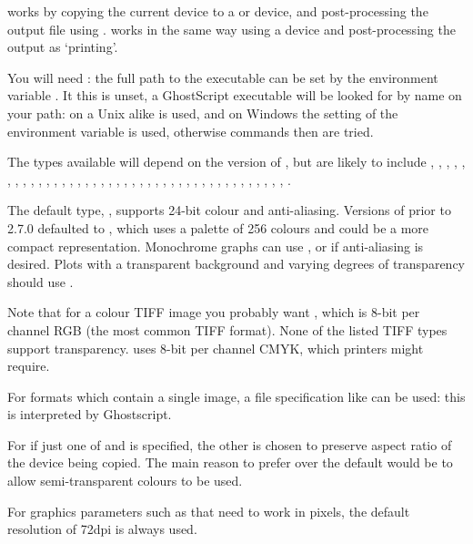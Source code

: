\begin{Details}\relax
{} works by copying the current device to a
 or  device, and
post-processing the output file using .
 works in the same way using a  device
and post-processing the output as `printing'.

You will need : the full path to the executable can
be set by the environment variable . It this is unset, a
GhostScript executable will be looked for by name on your path: on a
Unix alike  is used, and on Windows the setting of the
environment variable  is used, otherwise commands
 then  are tried.

The types available will depend on the version of ,
but are likely to include
, , , ,
, , , ,
, , , ,
, , , ,
, , , ,
, , ,
, , , 
, , , ,
, , , ,
, , , ,
, , , .

The default type, , supports 24-bit colour and
anti-aliasing.  Versions of \R{} prior to 2.7.0 defaulted to
, which uses a palette of 256 colours and could be a
more compact representation.  Monochrome graphs can use
, or  if anti-aliasing is desired.
Plots with a transparent background and varying degrees of
transparency should use .

Note that for a colour TIFF image you probably want ,
which is 8-bit per channel RGB (the most common TIFF format).  None of
the listed TIFF types support transparency.   uses
8-bit per channel CMYK, which printers might require.

For formats which contain a single image, a file specification like
 can be used: this is interpreted by Ghostscript.

For  if just one of  and  is
specified, the other is chosen to preserve aspect ratio of the
device being copied.  The main reason to prefer 
over the default would be to allow semi-transparent colours to be used.

For graphics parameters such as  that need to work in
pixels, the default resolution of 72dpi is always used.

\end{Details}
